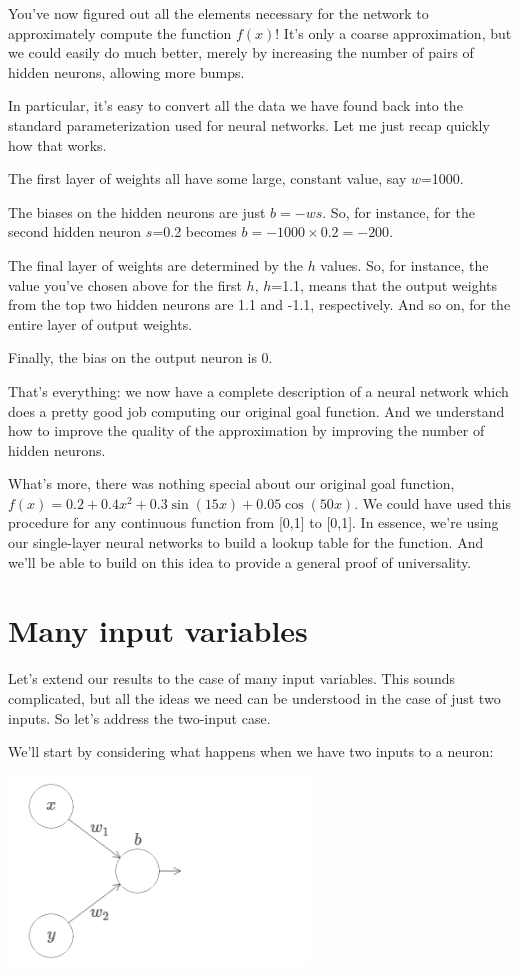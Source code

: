 You've now figured out all the elements necessary for the network to approximately compute the function $f(x)$! It's only a coarse approximation, but we could easily do much better, merely by increasing the number of pairs of hidden neurons, allowing more bumps.

In particular, it's easy to convert all the data we have found back into the standard parameterization used for neural networks. Let me just recap quickly how that works.

The first layer of weights all have some large, constant value, say $w$=1000.

The biases on the hidden neurons are just $b=-ws$. So, for instance, for the second hidden neuron $s$=0.2 becomes $b=-1000\times 0.2=-200$.

The final layer of weights are determined by the $h$ values. So, for instance, the value you've chosen above for the first $h$, $h$=1.1, means that the output weights from the top two hidden neurons are 1.1 and -1.1, respectively. And so on, for the entire layer of output weights.

Finally, the bias on the output neuron is 0.

That's everything: we now have a complete description of a neural network which does a pretty good job computing our original goal function. And we understand how to improve the quality of the approximation by improving the number of hidden neurons.

What's more, there was nothing special about our original goal function, $f(x)=0.2+0.4x^2+0.3\sin(15x)+0.05\cos(50x)$. We could have used this procedure for any continuous function from [0,1] to [0,1]. In essence, we're using our single-layer neural networks to build a lookup table for the function. And we'll be able to build on this idea to provide a general proof of universality.

\section{Many input variables}
Let's extend our results to the case of many input variables. This sounds complicated, but all the ideas we need can be understood in the case of just two inputs. So let's address the two-input case.

We'll start by considering what happens when we have two inputs to a neuron:

{\centering \includegraphics[width=0.6\textwidth,]{pic/wigglyfn20} \par}

